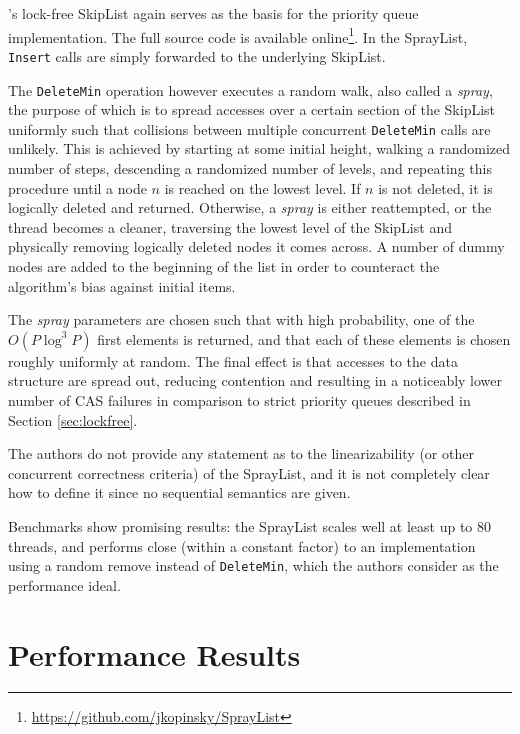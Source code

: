 \documentclass[a4paper,10pt]{article}
\begin{document}
\citeauthor{fraser2004practical}'s lock-free SkipList \cite{fraser2004practical} again serves as the
basis for the priority queue implementation. The full source code is available online\footnote{
\url{https://github.com/jkopinsky/SprayList}}. In the SprayList, \lstinline|Insert| calls are simply
forwarded to the underlying SkipList.

The \lstinline|DeleteMin| operation however executes a random walk, also called a \emph{spray}, the
purpose of which is to spread accesses over a certain section of the SkipList uniformly such that
collisions between multiple concurrent \lstinline|DeleteMin| calls are unlikely. This is achieved by
starting at some initial height, walking a randomized number of steps, descending a randomized number of levels,
and repeating this procedure until a node $n$ is reached on the lowest level. If $n$ is not deleted,
it is logically deleted and returned. Otherwise, a \emph{spray} is either reattempted, or the thread
becomes a cleaner, traversing the lowest level of the SkipList and physically removing logically deleted
nodes it comes across. A number of dummy nodes are added to the beginning of the list in order to counteract
the algorithm's bias against initial items.

The \emph{spray} parameters are chosen such that with high probability, one of the $O(P \log^3 P)$
first elements is returned, and that each of these elements is chosen roughly uniformly at random.
The final effect is that accesses to the data structure are spread out, reducing contention and resulting
in a noticeably lower number of \ac{CAS} failures in comparison to strict priority queues described
in Section \ref{sec:lockfree}.

The authors do not provide any statement as to the linearizability (or other concurrent correctness
criteria) of the SprayList, and it is not completely clear how to define it since no
sequential semantics are given.

Benchmarks show promising results: the SprayList scales well at least up to 80 threads,
and performs close (within a constant factor) to an implementation using a random remove instead
of \lstinline|DeleteMin|, which the authors consider as the performance ideal.


\section{Performance Results}
\end{document}
